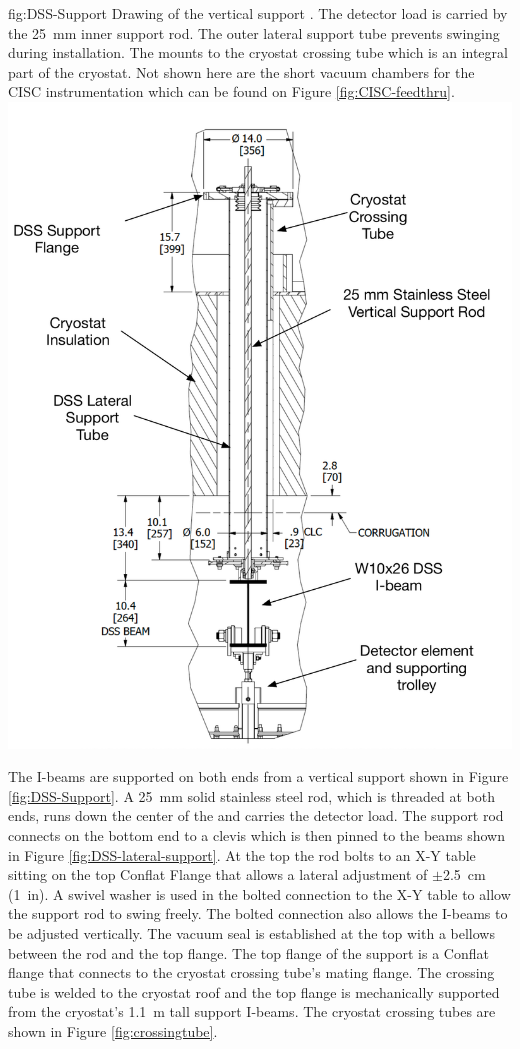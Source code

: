 \begin{dunefigure}{fig:DSS-Support}
  { Drawing of the  vertical support \fdth. The detector load is carried by the \SI{25}{mm} inner support rod. The outer lateral support tube prevents swinging during installation.  The \fdth mounts to the cryostat crossing tube which is an integral part of the cryostat. Not shown here are the short vacuum chambers for the CISC instrumentation which can be found on Figure \ref{fig:CISC-feedthru}.}
\includegraphics[width=.85\textwidth]{graphics/DSS-Support.pdf}
\end{dunefigure}


The  I-beams are supported on both ends from a vertical support \fdth shown in Figure \ref{fig:DSS-Support}. A \SI{25}{mm} solid stainless steel rod, which is threaded at both ends, runs down the center of the \fdth and carries the detector load. The support  rod connects on the bottom end to a clevis which is then pinned to the  beams shown in Figure \ref{fig:DSS-lateral-support}. At the top the rod bolts to an X-Y table sitting on the top Conflat Flange that allows a lateral adjustment of $\pm$\SI{2.5}{cm} (\SI{1}{in}). A swivel washer is used in the bolted connection to the X-Y table to allow the support rod to swing freely. The bolted connection also allows the  I-beams to be adjusted vertically. The vacuum seal is established at the top with a bellows between the rod and the top flange. The top flange of the  support \fdth is a Conflat flange that connects to the cryostat crossing tube's mating flange. The crossing  tube is welded to the cryostat roof and the top flange is mechanically supported from the cryostat's  \SI{1.1}{m} tall support I-beams. The cryostat crossing tubes are shown in Figure \ref{fig:crossingtube}.

